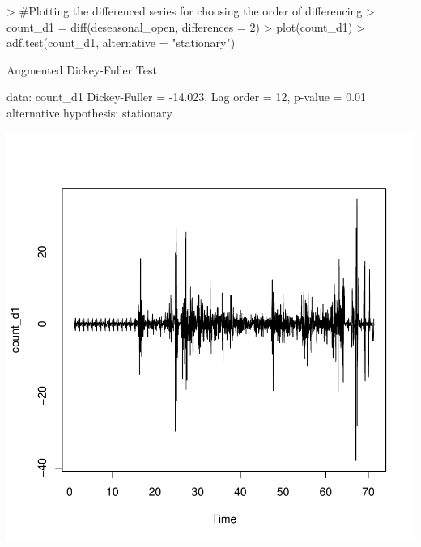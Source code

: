 \documentclass{article}
\begin{document}
\begin{Schunk}
\begin{Sinput}
> #Plotting the differenced series for choosing the order of differencing
> count_d1 = diff(deseasonal_open, differences = 2)
> plot(count_d1)
> adf.test(count_d1, alternative = "stationary")
\end{Sinput}
\begin{Soutput}
	Augmented Dickey-Fuller Test

data:  count_d1
Dickey-Fuller = -14.023, Lag order = 12, p-value = 0.01
alternative hypothesis: stationary
\end{Soutput}
\end{Schunk}
\includegraphics{Report-018}
\end{document}
